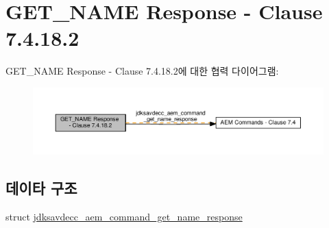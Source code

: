 \hypertarget{group__command__get__name__response}{}\section{G\+E\+T\+\_\+\+N\+A\+ME Response -\/ Clause 7.4.18.2}
\label{group__command__get__name__response}
G\+E\+T\+\_\+\+N\+A\+ME Response -\/ Clause 7.4.18.2에 대한 협력 다이어그램\+:
\nopagebreak
\begin{figure}[H]
\begin{center}
\leavevmode
\includegraphics[width=350pt]{group__command__get__name__response}
\end{center}
\end{figure}
\subsection*{데이타 구조}
\begin{DoxyCompactItemize}
\item 
struct \hyperlink{structjdksavdecc__aem__command__get__name__response}{jdksavdecc\+\_\+aem\+\_\+command\+\_\+get\+\_\+name\+\_\+response}
\end{DoxyCompactItemize}
